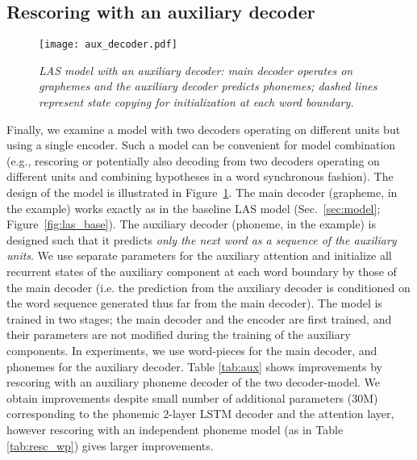\documentclass[a4paper]{article}
\begin{document}
\subsection{Rescoring with an auxiliary decoder}
      \vspace{-1mm}
\begin{figure}[t]
  \centerline{\texttt{[image: aux\_decoder.pdf]}}
        \vspace{-1mm}
	\caption{\it LAS model with an auxiliary decoder: main
	decoder operates on graphemes and the auxiliary decoder predicts
	phonemes; dashed lines represent state copying for initialization at
	each word boundary.}
	\label{fig:las_aux}
	\vspace{-6mm}
\end{figure}
\label{sec:twodecmodel}
Finally, we examine a model with two decoders operating on different units but using a single encoder.
Such a model can be convenient for model combination (e.g., rescoring or potentially also decoding from two decoders operating on different units and combining hypotheses in a word synchronous fashion).
The design of the model is illustrated in Figure~\ref{fig:las_aux}.
The main decoder (grapheme, in the example) works exactly as in the baseline LAS model (Sec.~\ref{sec:model}; Figure~\ref{fig:las_base}).
The auxiliary decoder (phoneme, in the example) is designed such that it
predicts \emph{only the next word as a sequence of the auxiliary units}.
We use separate parameters for the auxiliary attention and initialize all recurrent states
of the auxiliary component at each word boundary by those of the main decoder (i.e. the prediction
from the auxiliary decoder is conditioned on the word sequence generated thus far from the main decoder).
The model is trained in two stages;
the main decoder and the encoder are first trained, and their parameters are not modified during the training of
the auxiliary components.
In experiments, we use word-pieces for the main decoder, and phonemes for the
auxiliary decoder.
Table \ref{tab:aux} shows improvements by rescoring with an auxiliary phoneme decoder of the two decoder-model.
We obtain improvements despite small number of additional parameters (30M) corresponding to the phonemic 2-layer LSTM decoder and the attention layer, however rescoring with an independent phoneme model (as in Table \ref{tab:resc_wp}) gives larger improvements.
\vspace{-3mm}
\end{document}
